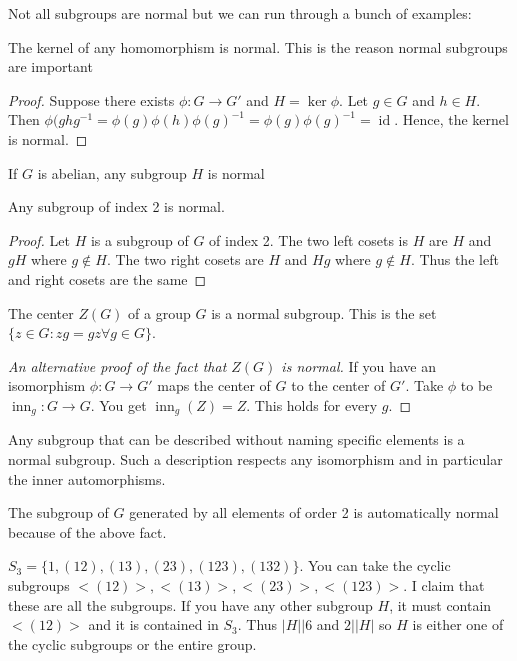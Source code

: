 \documentclass{article}
\newcommand{\ra}[1][]{\xrightarrow{#1}}
\DeclareMathOperator{\inn}{inn}
\DeclareMathOperator{\id}{id}
\begin{document}
Not all subgroups are normal but we can run through a bunch of examples:
\begin{example}
The kernel of any homomorphism is normal. This is the reason normal subgroups are important
\end{example}
\begin{proof}
Suppose there exists $\phi:G\ra{}G'$ and $H=\ker\phi$. Let $g\in G$ and $h\in H$. Then $\phi(ghg^{-1}=\phi(g)\phi(h)\phi(g)^{-1}=\phi(g)\phi(g)^{-1}=\id$. Hence, the kernel is normal.
\end{proof}
\begin{example}
If $G$ is abelian, any subgroup $H$ is normal
\end{example}
\begin{proposition}
Any subgroup of index 2 is normal.
\end{proposition}
\begin{proof}
Let $H$ is a subgroup of $G$ of index 2. The two left cosets is $H$ are $H$ and $gH$ where $g\notin H$. The two right cosets are $H$ and $Hg$ where $g\notin H$. Thus the left and right cosets are the same
\end{proof}
\begin{example}
The center $Z(G)$ of a group $G$ is a normal subgroup. This is the set $\{z\in G:zg=gz\forall g\in G\}$.
\end{example}
\begin{proof}[An alternative proof of the fact that $Z(G)$ is normal]
If you have an isomorphism $\phi:G\ra{}G'$ maps the center of $G$ to the center of $G'$. Take $\phi$ to be $\inn_g:G\ra{}G$. You get $\inn_g(Z)=Z$. This holds for every $g$.
\end{proof}
\begin{fact}
Any subgroup that can be described without naming specific elements is a normal subgroup. Such a description respects any isomorphism and in particular the inner automorphisms.
\end{fact}
\begin{example}
The subgroup of $G$ generated by all elements of order 2 is automatically normal because of the above fact.
\end{example}
\begin{example}[Subgroups of $S_3$]
$S_3=\{1,(1 2), (1 3), (2 3), (1 2 3), (1 3 2)\}$. You can take the cyclic subgroups $<(1 2)>, <(13)>, <(23)>, <(123)>$. I claim that these are all the subgroups. If you have any other subgroup $H$, it must contain $<(12)>$ and it is contained in $S_3$. Thus $|H||6$ and $2||H|$ so $H$ is either one of the cyclic subgroups or the entire group.
\end{example}
\end{document}
